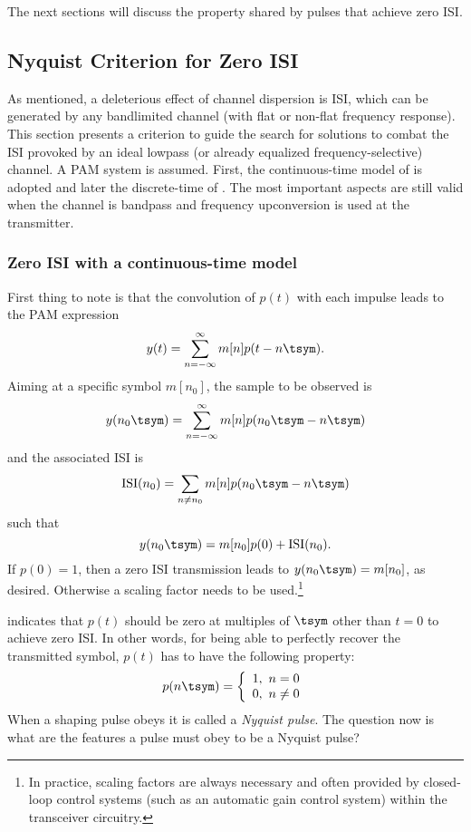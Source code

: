 
The next sections will discuss the property shared by pulses that achieve zero ISI.

\subsection{Nyquist Criterion for Zero ISI}
As mentioned, a deleterious effect of channel dispersion is ISI, which can be generated by any bandlimited channel (with flat or non-flat frequency response). 
This section presents a criterion to guide the search for solutions to combat the ISI provoked by an ideal lowpass (or already equalized frequency-selective) channel. A PAM system is assumed. First, the continuous-time model of  is adopted and later the discrete-time of . The most important aspects are still valid when the channel is bandpass and frequency upconversion is used at the transmitter.

\subsubsection{Zero ISI with a continuous-time model}


First thing to note is that the convolution of $p(t)$ with each impulse leads to the PAM expression
\[
y(t) = \sum_{n=-\infty}^{\infty} m[n] p(t-n \tsym).
\]
Aiming at a specific symbol $m[n_0]$, the sample to be observed is
\[
y(n_0 \tsym) = \sum_{n=-\infty}^{\infty} m[n] p(n_0 \tsym -n \tsym)
\]
and the associated ISI is
\begin{equation}
\textrm{ISI}{(n_0)} = \sum_{n \ne n_0} m[n] p(n_0 \tsym -n \tsym)
\label{eq:isi_pam}
\end{equation}
such that
\[
y(n_0 \tsym) = m[n_0]p(0) + \textrm{ISI}{(n_0)}.
\]
If $p(0)=1$, then a zero ISI transmission leads to $y(n_0 \tsym) = m[n_0]$, as desired. Otherwise a scaling factor needs to be used.\footnote{In practice, scaling factors are always
necessary and often provided by closed-loop control systems (such as an automatic gain control system) within the transceiver circuitry.}

 indicates that $p(t)$ should be zero at multiples of $\tsym$ other than $t=0$  to achieve zero ISI. In other words, for being able to perfectly recover the transmitted symbol, $p(t)$ has to have the following property:
\begin{equation}
p(n \tsym) = \left\{ \begin{array}{l} 1,~n = 0 \\ 0,~n \ne 0 \end{array} \right.
\label{eq:nyquistPulses}
\end{equation}
When a shaping pulse obeys  it is called a \emph{Nyquist pulse}.
The question now is what are the features a pulse must obey to be a Nyquist pulse?

